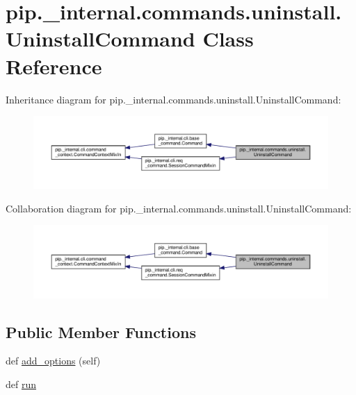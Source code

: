 \hypertarget{classpip_1_1__internal_1_1commands_1_1uninstall_1_1UninstallCommand}{}\section{pip.\+\_\+internal.\+commands.\+uninstall.\+Uninstall\+Command Class Reference}
\label{classpip_1_1__internal_1_1commands_1_1uninstall_1_1UninstallCommand}


Inheritance diagram for pip.\+\_\+internal.\+commands.\+uninstall.\+Uninstall\+Command\+:
\nopagebreak
\begin{figure}[H]
\begin{center}
\leavevmode
\includegraphics[width=350pt]{classpip_1_1__internal_1_1commands_1_1uninstall_1_1UninstallCommand__inherit__graph}
\end{center}
\end{figure}


Collaboration diagram for pip.\+\_\+internal.\+commands.\+uninstall.\+Uninstall\+Command\+:
\nopagebreak
\begin{figure}[H]
\begin{center}
\leavevmode
\includegraphics[width=350pt]{classpip_1_1__internal_1_1commands_1_1uninstall_1_1UninstallCommand__coll__graph}
\end{center}
\end{figure}
\subsection*{Public Member Functions}
\begin{DoxyCompactItemize}
\item 
def \hyperlink{classpip_1_1__internal_1_1commands_1_1uninstall_1_1UninstallCommand_ababeb27770df5ac9d32df4aee3bb739e}{add\+\_\+options} (self)
\item 
def \hyperlink{classpip_1_1__internal_1_1commands_1_1uninstall_1_1UninstallCommand_a5d9db2cbd4bbac4222b66568ab242ea9}{run}
\end{DoxyCompactItemize}
